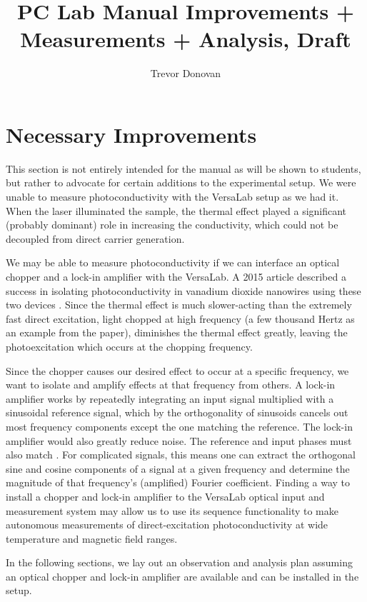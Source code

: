 \documentclass{article}
\title{PC Lab Manual Improvements + Measurements + Analysis, Draft}
\author{Trevor Donovan}
\date{}
\begin{document}
\maketitle

\section*{Necessary Improvements}

This section is not entirely intended for the manual as will be shown to students, but rather to advocate for certain additions to the experimental setup. We were unable to measure photoconductivity with the VersaLab setup as we had it. When the laser illuminated the sample, the thermal effect played a significant (probably dominant) role in increasing the conductivity, which could not be decoupled from direct carrier generation.

We may be able to measure photoconductivity if we can interface an optical chopper and a lock-in amplifier with the VersaLab. A 2015 article described a success in isolating photoconductivity in vanadium dioxide nanowires using these two devices \parencite{wang2015}. Since the thermal effect is much slower-acting than the extremely fast direct excitation, light chopped at high frequency (a few thousand Hertz as an example from the paper), diminishes the thermal effect greatly, leaving the photoexcitation which occurs at the chopping frequency.

Since the chopper causes our desired effect to occur at a specific frequency, we want to isolate and amplify effects at that frequency from others. A lock-in amplifier works by repeatedly integrating an input signal multiplied with a sinusoidal reference signal, which by the orthogonality of sinusoids cancels out most frequency components except the one matching the reference. The lock-in amplifier would also greatly reduce noise. The reference and input phases must also match \parencite{aboutLIAs}. For complicated signals, this means one can extract the orthogonal sine and cosine components of a signal at a given frequency and determine the magnitude of that frequency's (amplified) Fourier coefficient. Finding a way to install a chopper and lock-in amplifier to the VersaLab optical input and measurement system may allow us to use its sequence functionality to make autonomous measurements of direct-excitation photoconductivity at wide temperature and magnetic field ranges.

In the following sections, we lay out an observation and analysis plan assuming an optical chopper and lock-in amplifier are available and can be installed in the setup.
\end{document}
